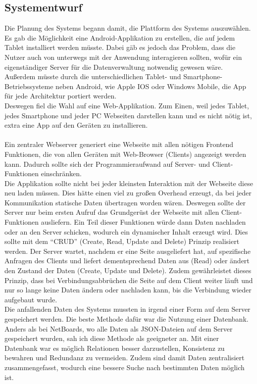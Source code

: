 \subsection{Systementwurf}\label{Systementwurf}
Die Planung des Systems begann damit, die Plattform des Systems auszuwählen. Es gab die Möglichkeit eine Android-Applikation zu erstellen, die auf jedem Tablet installiert werden müsste. Dabei gäb es jedoch das Problem, dass die Nutzer auch von unterwegs mit der Anwendung interagieren sollten, wofür ein eigenständiger Server für die Datenverwaltung notwendig gewesen wäre. Außerdem müsste durch die unterschiedlichen Tablet- und Smartphone-Betriebssysteme neben Android, wie Apple IOS oder Windows Mobile, die App für jede Architektur portiert werden.
\\
Deswegen fiel die Wahl auf eine Web-Applikation. Zum Einen, weil jedes Tablet, jedes Smartphone und jeder PC Webseiten darstellen kann und es nicht nötig ist, extra eine App auf den Geräten zu installieren.
\\ \\
Ein zentraler Webserver generiert eine Webseite mit allen nötigen Frontend Funktionen, die von allen Geräten mit Web-Browser (Clients) angezeigt werden kann. Dadurch sollte sich der Programmieraufwand auf Server- und Client-Funktionen einschränken.
\\
Die Applikation sollte nicht bei jeder kleinsten Interaktion mit der Webseite diese neu laden müssen. Dies hätte einen viel zu großen Overhead erzeugt, da bei jeder Kommunikation statische Daten übertragen worden wären.
Deswegen sollte der Server nur beim ersten Aufruf das Grundgerüst der Webseite mit allen Client-Funktionen ausliefern. Ein Teil dieser Funktionen würde dann Daten nachladen oder an den Server schicken, wodurch ein dynamischer Inhalt erzeugt wird.
Dies sollte mit dem ``CRUD'' (Create, Read, Update and Delete) Prinzip realisiert werden.
Der Server wartet, nachdem er eine Seite ausgeliefert hat, auf spezifische Anfragen des Clients und liefert dementsprechend Daten aus (Read) oder ändert den Zustand der Daten (Create, Update und Delete). Zudem gewährleistet dieses Prinzip, dass bei Verbindungsabbrüchen die Seite auf dem Client weiter läuft und nur so lange keine Daten ändern oder nachladen kann, bis die Verbindung wieder aufgebaut wurde.
\\
Die anfallenden Daten des Systems mussten in irgend einer Form auf dem Server gespeichert werden. Die beste Methode dafür war die Nutzung einer Datenbank. Anders als bei NetBoards, wo alle Daten als JSON-Dateien auf dem Server gespeichert wurden, sah ich diese Methode als geeigneter an. Mit einer Datenbank war es möglich Relationen besser darzustellen, Konsistenz zu bewahren und Redundanz zu vermeiden. Zudem sind damit Daten zentralisiert zusammengefasst, wodurch eine bessere Suche nach bestimmten Daten möglich ist.
